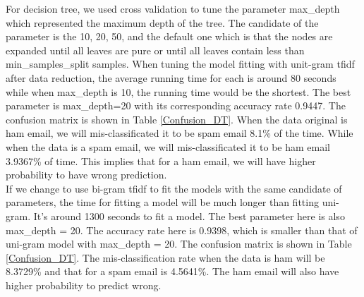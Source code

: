 
For decision tree, we used cross validation to tune the parameter max\_depth which represented the maximum depth of the tree. The candidate of the parameter is the 10, 20, 50, and the default one which is that the nodes are expanded until all leaves are pure or until all leaves contain less than min\_samples\_split samples. When tuning the model fitting with unit-gram tfidf after data reduction, the average running time for each is around 80 seconds while when max\_depth is 10, the running time would be the shortest. The best parameter is max\_depth=20 with its corresponding accuracy rate 0.9447. The confusion matrix is shown in Table \ref{Confusion_DT}. When the data original is ham email, we will mis-classificated it to be spam email 8.1\% of the time. While when the data is a spam email, we will mis-classificated it to be ham email 3.9367\% of time. This implies that for a ham email, we will have higher probability to have wrong prediction.\\

If we change to use bi-gram tfidf to fit the models with the same candidate of parameters, the time for fitting a model will be much longer than fitting uni-gram. It's around 1300 seconds to fit a model. The best parameter here is also max\_depth = 20. The accuracy rate here is 0.9398, which is smaller than that of uni-gram model with max\_depth = 20. The confusion matrix is shown in Table \ref{Confusion_DT}. The mis-classification rate when the data is ham will be 8.3729\% and that for a spam email is 4.5641\%. The ham email will also have higher probability to predict wrong. 



